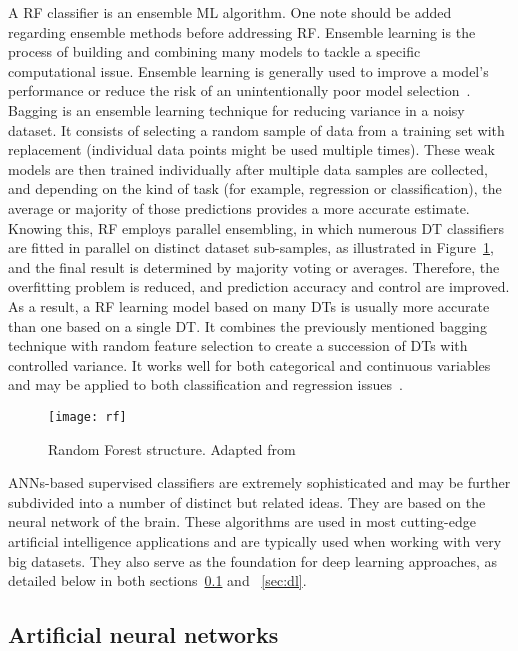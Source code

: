 A \gls{RF} classifier is an ensemble \gls{ML} algorithm. One note should be added regarding ensemble methods before addressing \gls{RF}. Ensemble learning is the process of building and combining many models to tackle a specific computational issue. Ensemble learning is generally used to improve a model's performance or reduce the risk of an unintentionally poor model selection~\cite{Mahesh2019MachineReview}. Bagging is an ensemble learning technique for reducing variance in a noisy dataset. It consists of selecting a random sample of data from a training set with replacement (individual data points might be used multiple times). These weak models are then trained individually after multiple data samples are collected, and depending on the kind of task (for example, regression or classification), the average or majority of those predictions provides a more accurate estimate. Knowing this, \gls{RF} employs parallel ensembling, in which numerous \gls{DT} classifiers are fitted in parallel on distinct dataset sub-samples, as illustrated in Figure~\ref{fig:random_forest2}, and the final result is determined by majority voting or averages. Therefore, the overfitting problem is reduced, and prediction accuracy and control are improved. As a result, a \gls{RF} learning model based on many \gls{DT}s is usually more accurate than one based on a single \gls{DT}. It combines the previously mentioned bagging technique with random feature selection to create a succession of \gls{DT}s with controlled variance. It works well for both categorical and continuous variables and may be applied to both classification and regression issues~\cite{Sarker2021MachineDirections}.

\begin{figure}[htbp]
    \centering
    \texttt{[image: rf]}
    \caption{Random Forest structure. Adapted from~\cite{Sarker2021MachineDirections}}
    \label{fig:random_forest2}
\end{figure}

\gls{ANN}s-based supervised classifiers are extremely sophisticated and may be further subdivided into a number of distinct but related ideas. They are based on the neural network of the brain. These algorithms are used in most cutting-edge artificial intelligence applications and are typically used when working with very big datasets. They also serve as the foundation for deep learning approaches, as detailed below in both sections~\ref{sec:ann} and ~\ref{sec:dl}.

\subsection{Artificial neural networks}\label{sec:ann}

